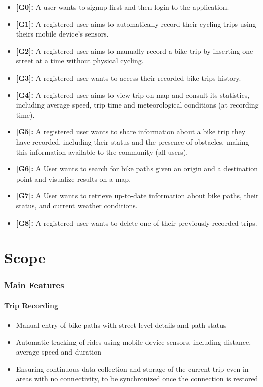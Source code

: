 \begin{itemize}
    \item \textbf{[G0]:} A user wants to signup first and then login to the application.
    \item \textbf{[G1]:} A registered user aims to automatically record their cycling trips using theirs mobile device's sensors. 
    \item \textbf{[G2]:} A registered user aims to manually record a bike trip by inserting one street at a time without physical cycling.
    \item \textbf{[G3]:} A registered user wants to access their recorded bike trips history.
    \item \textbf{[G4]:} A registered user aims to view trip on map and consult its statistics, including average speed, trip time and meteorological conditions (at recording time).
    \item \textbf{[G5]:} A registered user wants to share information about a bike trip they have recorded, including their status and the presence of obstacles, making this information available to the community (all users).
    \item \textbf{[G6]:} A User wants to search for bike paths given an origin and a destination point and visualize results on a map.
    \item \textbf{[G7]:} A User wants to retrieve up-to-date information about bike paths, their status, and current weather conditions.
    \item \textbf{[G8]:} A registered user wants to delete one of their previously recorded trips.
\end{itemize}

\section{Scope}
\label{sec:scope}

\subsubsection{Main Features}

\paragraph{Trip Recording}
\begin{itemize}
    \item Manual entry of bike paths with street-level details and path status
    \item Automatic tracking of rides using mobile device sensors, including distance, average speed and duration
    \item Ensuring continuous data collection and storage of the current trip even in areas with no connectivity, to be synchronized once the connection is restored
\end{itemize}


